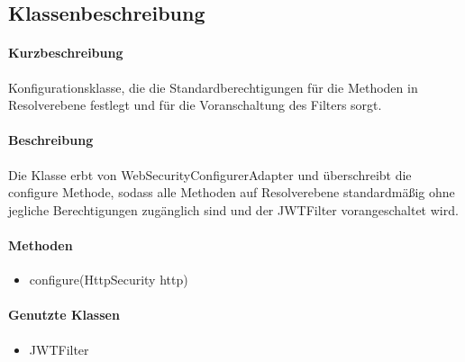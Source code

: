 \subsection{Klassenbeschreibung}%
\paragraph*{Kurzbeschreibung}
Konfigurationsklasse, die die Standardberechtigungen für die Methoden in Resolverebene festlegt und für die Voranschaltung des Filters sorgt.
\paragraph*{Beschreibung}
Die Klasse erbt von \dq WebSecurityConfigurerAdapter \dq und überschreibt die \dq configure \dq Methode, sodass 
alle Methoden auf Resolverebene standardmäßig ohne jegliche Berechtigungen zugänglich sind und der JWTFilter vorangeschaltet wird.
\paragraph*{Methoden}
\begin{itemize}
	\item configure(HttpSecurity http)
\end{itemize}	
\paragraph*{Genutzte Klassen}
\begin{itemize}
	\item JWTFilter
\end{itemize}	
